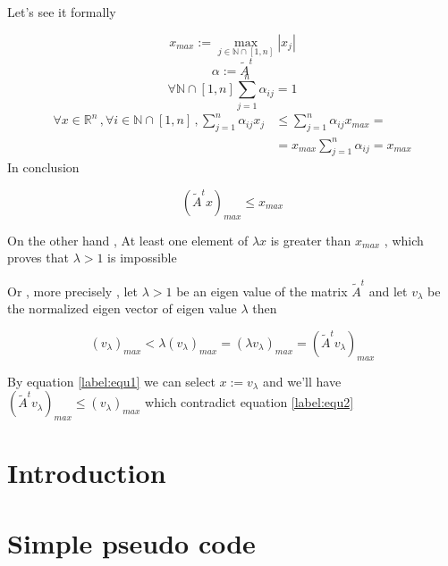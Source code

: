 \documentclass[9pt,twocolumn]{article}
\begin{document}
Let's see it formally

\[
x_{max} := \max_{j\in\mathbb{N}\cap [1,n]}{|x_j|}
\]
\[
\alpha := \tilde{A}^t
\]
\[
\forall \mathbb{N}\cap [1,n] \sum_{j=1}^{n} \alpha_{ij} = 1
\]
\begin{align*}
\forall x\in \mathbb{R}^{n} \,, \forall i\in\mathbb{N}\cap [1,n]  \,, \sum_{j=1}^n\alpha _{ij} x_{j}  &\leq\sum_{j=1}^n \alpha_{ij}x_{max}= \\
                                                                    &=x_{max} \sum_{j=1}^{n} \alpha_{ij} = x_{max}
\end{align*}
In conclusion

\begin{equation}
\label{label:equ1}
(\tilde{A}^t x)_{max} \leq x_{max}
\end{equation}

On the other hand , At least one element of \(\lambda x\) is greater than \(x_{max}\) , which proves that
\(\lambda > 1\) is impossible

Or , more precisely , let \(\lambda > 1\) be an eigen value of the matrix
\(\tilde{A}^t\) and let \(v_{\lambda}\) be the normalized eigen vector of
eigen value \(\lambda\) then

\begin{equation}
\label{label:equ2}
(v_{\lambda})_{max} <
\lambda (v_{\lambda})_{max} =
( \lambda v_{\lambda} )_{max} =
( \tilde{A}^t v_{\lambda} )_{max}
\end{equation}

By equation \ref{label:equ1} we can select \(x:=v_{\lambda}\) and we'll have
\((\tilde{A}^t v_{\lambda})_{max} \leq (v_{\lambda})_{max}\) which contradict equation \ref{label:equ2}




\section*{Introduction}
\label{sec:org1781c91}

\section*{Simple pseudo code}
\label{sec:org568199d}
\end{document}
